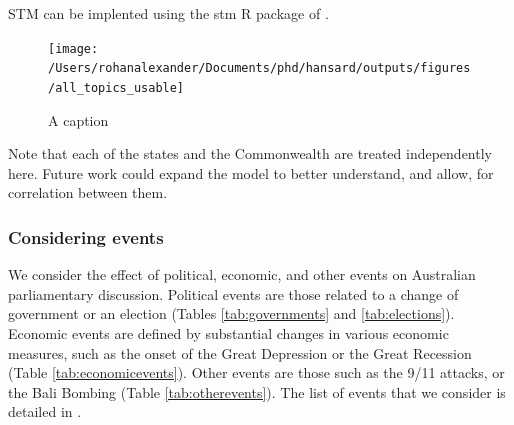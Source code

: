 \documentclass[12pt,]{article}
\theoremstyle{definition}
\theoremstyle{definition}
\theoremstyle{definition}
\theoremstyle{remark}
\begin{document}
STM can be implented using the stm R package of
\citet{RobertsStewartAiroldiRPackage}.

\begin{figure}
\texttt{[image: /Users/rohanalexander/Documents/phd/hansard/outputs/figures/all\_topics\_usable]} \caption{A caption}\label{fig:pressure}
\end{figure}

Note that each of the states and the Commonwealth are treated
independently here. Future work could expand the model to better
understand, and allow, for correlation between them.

\subsubsection{Considering events}\label{considering-events}

We consider the effect of political, economic, and other events on
Australian parliamentary discussion. Political events are those related
to a change of government or an election (Tables \ref{tab:governments}
and \ref{tab:elections}). Economic events are defined by substantial
changes in various economic measures, such as the onset of the Great
Depression or the Great Recession (Table \ref{tab:economicevents}).
Other events are those such as the 9/11 attacks, or the Bali Bombing
(Table \ref{tab:otherevents}). The list of events that we consider is
detailed in .
\end{document}

